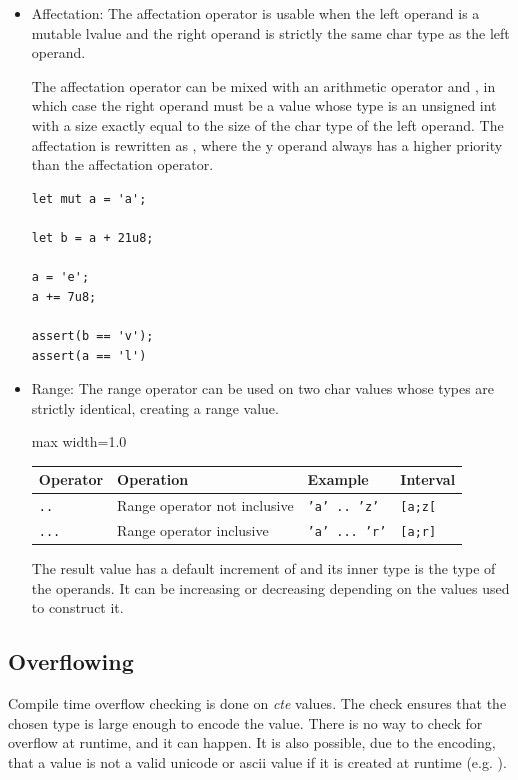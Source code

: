 \begin{itemize}
\item Affectation: The affectation operator \token{=} is usable when the left
  operand is a mutable lvalue and the right operand is strictly the same char
  type as the left operand.

  The affectation operator can be mixed with an arithmetic operator \token{+=}
  and \token{-=}, in which case the right operand must be a value whose type is
  an unsigned int with a size exactly equal to the size of the char type of the
  left operand. The affectation  is rewritten as , where the y operand always has a higher priority than the affectation
  operator.

  \begin{lstlisting}[style=coloredverbatim]
let mut a = 'a';

let b = a + 21u8;

a = 'e';
a += 7u8;

assert(b == 'v');
assert(a == 'l')
  \end{lstlisting}

\item Range: The range operator can be used on two char values whose types are
  strictly identical, creating a range value.

  \begin{center}
    \begin{adjustbox}{max width=1.0\linewidth}
      \begin{tabular}{|l|lll|}
        \hline
        Operator & Operation & Example & Interval\\[0pt]
        \hline
        \hline
        \texttt{..} & Range operator not inclusive & \texttt{'a' .. 'z'} & \texttt{[a;z[}\\[0pt]
            \texttt{...} & Range operator inclusive & \texttt{'a' ... 'r'} & \texttt{[a;r]}\\[0pt]
            \hline
      \end{tabular}
  \end{adjustbox}\end{center}


  The result value has a default increment of  and its inner type is
  the type of the operands. It can be increasing or decreasing depending on the
  values used to construct it.

\end{itemize}

\subsection{Overflowing}
\label{sec:orga9c18c5}

Compile time overflow checking is done on \textit{cte} values. The check ensures
that the chosen type is large enough to encode the value. There is no way to
check for overflow at runtime, and it can happen. It is also possible, due to
the encoding, that a value is not a valid unicode or ascii value if it is
created at runtime (e.g. ).

\vfill%
\pagebreak
